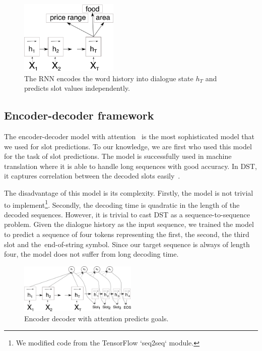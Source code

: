 \documentclass{itatnew}
\def\PB#1{\textcolor{red}{PB: \textit{#1}}}
\def\OD#1{{\color{darkgreen}OD: \it #1}}
\begin{document}
\begin{figure}
\begin{center}
\includegraphics[height=9.5em]{encoder}
\caption{The RNN encodes the word history into dialogue state $h_T$ and predicts slot values independently.}
\end{center}
\vspace{-0.80em}
\label{fig:encind}
\end{figure}

\subsection{Encoder-decoder framework}
\label{sec:encdec}
The encoder-decoder model with attention~\cite{bahdanau2014neural} is the most sophisticated model that we used for slot predictions.
To our knowledge, we are first who used this model for the task of slot predictions.
The model is successfully used in machine translation where it is able to handle long sequences with good accuracy.
In DST, it captures correlation between the decoded slots easily~\cite{bahdanau2014neural}. 

The disadvantage of this model is its complexity.
Firstly, the model is not trivial to implement\footnote{We modified code from the TensorFlow `seq2seq` module.}. Secondly, the decoding time is quadratic in the length of the decoded sequences.
However, it is trivial to cast DST as a sequence-to-sequence problem. Given the dialogue history as the input sequence, we trained the model to predict a sequence of four tokens representing the first, the second, the third slot and the~end-of-string symbol.
Since our target sequence is always of length four, the model does not suffer from long decoding time. 
\begin{figure}
\includegraphics[width=0.5\textwidth]{encdec}
\caption{Encoder decoder with attention predicts goals.}
\label{fig:encdec}
\end{figure}
\end{document}
